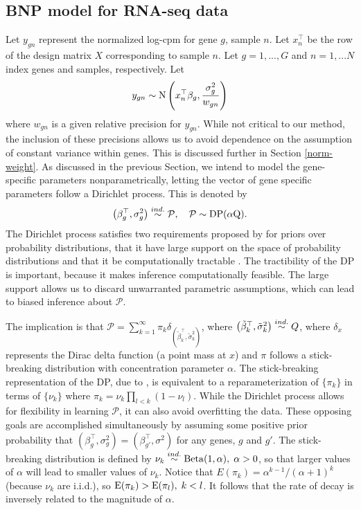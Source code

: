 \subsection{BNP model for RNA-seq data}
\label{sec:model}
Let $y_{gn}$ represent the normalized log-cpm for gene $g$, sample $n$. Let $x_{n}^\top$ be the row of the design matrix $X$ corresponding to sample $n$. Let $g=1,...,G$ and $n=1,...N$ index genes and samples, respectively. Let
\begin{equation}
y_{gn} \sim \operatorname{N} \left( x_{n}^\top \beta_g, \frac{\sigma^2_g}{w_{gn}} \right)
\end{equation}
where $w_{gn}$ is a given relative precision for $y_{gn}$. While not critical to our method, the inclusion of these precisions allows us to avoid dependence on the assumption of constant variance within genes. This is discussed further in Section \ref{norm-weight}. As discussed in the previous Section, we intend to model the gene-specific parameters nonparametrically, letting the vector of gene specific parameters follow a Dirichlet process. This is denoted by
\begin{equation}
\left(\beta_g^\top,\sigma^2_g\right) \stackrel{ind.}{\sim} \mathcal{P},\quad \mathcal{P} \sim \operatorname{DP}(\alpha \mbox{Q}).
\end{equation}
The Dirichlet process satisfies two requirements proposed by \citet{ferguson} for priors over probability distributions, that it have large support on the space of probability distributions and that it be computationally tractable \citep{ferguson}. The tractibility of the DP is important, because it makes inference computationally feasible. The large support allows us to discard unwarranted parametric assumptions, which can lead to biased inference about $\mathcal{P}$.

The implication is that $\mathcal{P} =\sum_{k=1}^\infty \pi_k \delta_{\left(\tilde{\beta}_k^\top ,\tilde{\sigma}^2_k\right)}$, where $\left(\tilde{\beta}_k^\top ,\tilde{\sigma}^2_k\right) \stackrel{ind.}{\sim} Q$, where $\delta_{x}$ represents the Dirac delta function (a point mass at $x$) and $\pi$ follows a stick-breaking distribution with concentration parameter $\alpha$. The stick-breaking representation of the DP, due to \citet{sethuraman}, is equivalent to a reparameterization of $\{\pi_k\}$ in terms of $\{\nu_k\}$ where $\pi_k = \nu_k \prod_{l<k}(1-\nu_l)$. While the Dirichlet process allows for flexibility in learning $\mathcal{P}$, it can also avoid overfitting the data. These opposing goals are accomplished simultaneously by assuming some positive prior probability that $(\beta_g^\top,\sigma_g^2)=(\beta_{g'}^\top,\sigma^2)$ for any genes, $g$ and $g'$. The stick-breaking distribution is defined by $\nu_k \stackrel{ind.}{\sim} \operatorname{Beta}(1, \alpha),\; \alpha>0$, so that larger values of $\alpha$ will lead to smaller values of $\nu_k$. Notice that $E(\pi_k)=\alpha^{k-1}/(\alpha+1)^{k}$ (because $\nu_k$ are i.i.d.), so $\operatorname{E}(\pi_k)>\operatorname{E}(\pi_l),\;k<l$. It follows that the rate of decay is inversely related to the magnitude of $\alpha$.

